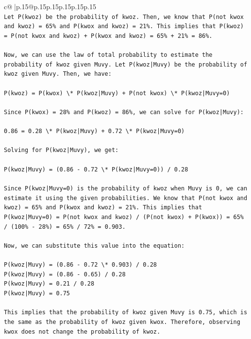 \documentclass{article}
\begin{document}
{\begin{supertabular}{c@{$\;$}|p{.15\linewidth}@{}p{.15\linewidth}p{.15\linewidth}p{.15\linewidth}p{.15\linewidth}p{.15\linewidth}}
{{{\\ 
\texttt{Let P(kwoz) be the probability of kwoz. Then, we know that P(not kwox and kwoz) = 65\% and P(kwox and kwoz) = 21\%. This implies that P(kwoz) = P(not kwox and kwoz) + P(kwox and kwoz) = 65\% + 21\% = 86\%.} \\
\\ 
\texttt{Now, we can use the law of total probability to estimate the probability of kwoz given Muvy. Let P(kwoz|Muvy) be the probability of kwoz given Muvy. Then, we have:} \\
\\ 
\texttt{P(kwoz) = P(kwox) \textbackslash{}* P(kwoz|Muvy) + P(not kwox) \textbackslash{}* P(kwoz|Muvy=0)} \\
\\ 
\texttt{Since P(kwox) = 28\% and P(kwoz) = 86\%, we can solve for P(kwoz|Muvy):} \\
\\ 
\texttt{0.86 = 0.28 \textbackslash{}* P(kwoz|Muvy) + 0.72 \textbackslash{}* P(kwoz|Muvy=0)} \\
\\ 
\texttt{Solving for P(kwoz|Muvy), we get:} \\
\\ 
\texttt{P(kwoz|Muvy) = (0.86 {-} 0.72 \textbackslash{}* P(kwoz|Muvy=0)) / 0.28} \\
\\ 
\texttt{Since P(kwoz|Muvy=0) is the probability of kwoz when Muvy is 0, we can estimate it using the given probabilities. We know that P(not kwox and kwoz) = 65\% and P(kwox and kwoz) = 21\%. This implies that P(kwoz|Muvy=0) = P(not kwox and kwoz) / (P(not kwox) + P(kwox)) = 65\% / (100\% {-} 28\%) = 65\% / 72\% = 0.903.} \\
\\ 
\texttt{Now, we can substitute this value into the equation:} \\
\\ 
\texttt{P(kwoz|Muvy) = (0.86 {-} 0.72 \textbackslash{}* 0.903) / 0.28} \\
\texttt{P(kwoz|Muvy) = (0.86 {-} 0.65) / 0.28} \\
\texttt{P(kwoz|Muvy) = 0.21 / 0.28} \\
\texttt{P(kwoz|Muvy) = 0.75} \\
\\ 
\texttt{This implies that the probability of kwoz given Muvy is 0.75, which is the same as the probability of kwoz given kwox. Therefore, observing kwox does not change the probability of kwoz.} \\
}}}
\end{supertabular}}
\end{document}
